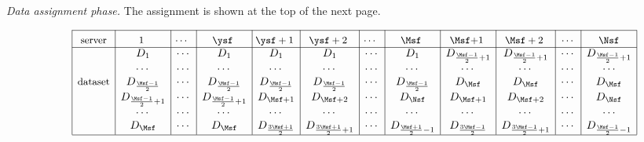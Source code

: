 \documentclass[conference,letterpaper]{IEEEtran}
\begin{document}
{\it Data assignment phase.}
The assignment is shown at the top of the next page.
\begin{figure*}
\begin{align*}
\begin{array}{rl|c|c|c|c|c|c|c|c|c|c|c|c|}\cline{3-3}\cline{4-4}\cline{5-5}\cline{6-6}\cline{7-7}\cline{8-8}\cline{9-9}\cline{10-10}\cline{11-11}\cline{12-12}\cline{13-13}\cline{14-14}
&&\rule{0pt}{1.2em}\mbox{\small server} &\rule{0pt}{1.2em}\mbox{\small \negmedspace\negmedspace 1 \negmedspace\negmedspace} & \mbox{\small \negmedspace\negmedspace $\cdots$ \negmedspace\negmedspace} &  \rule{0pt}{1.2em}\mbox{\small \negmedspace\negmedspace $\ysf$ \negmedspace\negmedspace}& \rule{0pt}{1.2em}\mbox{\small \negmedspace\negmedspace  $\ysf +1$ \negmedspace\negmedspace}&  \rule{0pt}{1.2em}\mbox{\small \negmedspace\negmedspace  $\ysf+2$ \negmedspace\negmedspace}&  \rule{0pt}{1.2em}\mbox{\small \negmedspace\negmedspace $\cdots$ \negmedspace\negmedspace} &  \rule{0pt}{1.2em}\mbox{\small \negmedspace\negmedspace $\Msf$ \negmedspace\negmedspace} &\rule{0pt}{1.2em}\mbox{\small \negmedspace\negmedspace  $\Msf$+1 \negmedspace\negmedspace} & \rule{0pt}{1.2em}\mbox{\small \negmedspace\negmedspace  $\Msf+2$ \negmedspace\negmedspace} & \rule{0pt}{1.2em}\mbox{\small \negmedspace\negmedspace $\cdots$\negmedspace\negmedspace }& \rule{0pt}{1.2em}\mbox{\small \negmedspace\negmedspace $\Nsf$\negmedspace\negmedspace} \\ 
\cline{3-3}\cline{4-4}\cline{5-5}\cline{6-6}\cline{7-7}\cline{8-8}\cline{9-9}\cline{10-10}\cline{11-11}\cline{12-12}\cline{13-13}\cline{14-14}
&& &D_1& \cdots       &   D_1 &  D_{1} &  D_{1} & \cdots &  D_{1}   &  D_{\frac{\Msf-1}{2}+1}   &  D_{\frac{\Msf-1}{2}+1} &  \cdots  &  D_{\frac{\Msf-1}{2}+1}  \\
&& &\cdots & \cdots & \cdots &  \cdots & \cdots  & \cdots   & \cdots  & \cdots & \cdots & \cdots & \cdots  \\ 
&& \mbox{\small dataset}&D_{\frac{\Msf-1}{2}} &    \cdots    & D_{\frac{\Msf-1}{2}}  & D_{\frac{\Msf-1}{2}} & D_{\frac{\Msf-1}{2}}    & \cdots  & D_{\frac{\Msf-1}{2}} &   D_{\Msf}  &   D_{\Msf}  &  \cdots  &  D_{\Msf}  \\
&& &D_{\frac{\Msf-1}{2}+1}&  \cdots  & D_{\frac{\Msf-1}{2}+1}  & D_{\Msf+1} & D_{\Msf+2} & \cdots & D_{\Nsf}& D_{\Msf+1}  &  D_{\Msf+2} &   \cdots  &  D_{\Nsf} \\ 
&& &\cdots &  \cdots       & \cdots & \cdots & \cdots   & \cdots & \cdots & \cdots & \cdots   & \cdots & \cdots \\
&& &D_{\Msf} &   \cdots  &  D_{\Msf} & D_{\frac{3\Msf+1}{2}} & D_{\frac{3\Msf+1}{2} +1}  & \cdots & D_{\frac{\Msf+1}{2}-1} &  D_{\frac{3\Msf-1}{2}}  &  D_{\frac{3\Msf-1}{2}+1}   &  \cdots  &  D_{\frac{\Msf-1}{2}-1}\\  
\cline{3-3}\cline{4-4}\cline{5-5}\cline{6-6}\cline{7-7}\cline{8-8}\cline{9-9}\cline{10-10}\cline{11-11}\cline{12-12}\cline{13-13}\cline{14-14}
\end{array} 
\end{align*}
\end{figure*}
\end{document}

